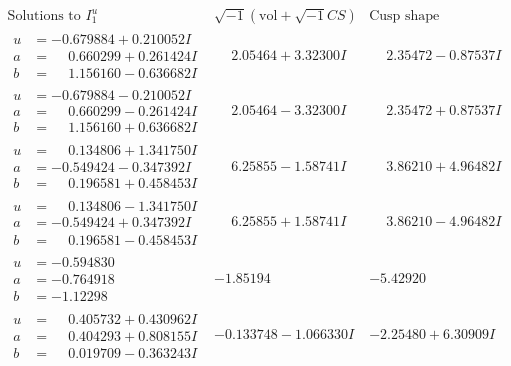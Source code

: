 \documentclass[1p]{elsarticle_modified}
\theoremstyle{definition}
\newcommand{\I}{\sqrt{-1}}
\begin{document}
$$\begin{array}{c|c|c}  
\text{Solutions to }I^u_{1}& \I (\text{vol} + \sqrt{-1}CS) & \text{Cusp shape}\\
 \hline 
\begin{aligned}
u &= -0.679884 + 0.210052 I \\
a &= \phantom{-}0.660299 + 0.261424 I \\
b &= \phantom{-}1.156160 - 0.636682 I\end{aligned}
 & \phantom{-}2.05464 + 3.32300 I & \phantom{-}2.35472 - 0.87537 I \\ \hline\begin{aligned}
u &= -0.679884 - 0.210052 I \\
a &= \phantom{-}0.660299 - 0.261424 I \\
b &= \phantom{-}1.156160 + 0.636682 I\end{aligned}
 & \phantom{-}2.05464 - 3.32300 I & \phantom{-}2.35472 + 0.87537 I \\ \hline\begin{aligned}
u &= \phantom{-}0.134806 + 1.341750 I \\
a &= -0.549424 - 0.347392 I \\
b &= \phantom{-}0.196581 + 0.458453 I\end{aligned}
 & \phantom{-}6.25855 - 1.58741 I & \phantom{-}3.86210 + 4.96482 I \\ \hline\begin{aligned}
u &= \phantom{-}0.134806 - 1.341750 I \\
a &= -0.549424 + 0.347392 I \\
b &= \phantom{-}0.196581 - 0.458453 I\end{aligned}
 & \phantom{-}6.25855 + 1.58741 I & \phantom{-}3.86210 - 4.96482 I \\ \hline\begin{aligned}
u &= -0.594830\phantom{ +0.000000I} \\
a &= -0.764918\phantom{ +0.000000I} \\
b &= -1.12298\phantom{ +0.000000I}\end{aligned}
 & -1.85194\phantom{ +0.000000I} & -5.42920\phantom{ +0.000000I} \\ \hline\begin{aligned}
u &= \phantom{-}0.405732 + 0.430962 I \\
a &= \phantom{-}0.404293 + 0.808155 I \\
b &= \phantom{-}0.019709 - 0.363243 I\end{aligned}
 & -0.133748 - 1.066330 I & -2.25480 + 6.30909 I \\ \hline\begin{aligned}

\end{aligned}
\end{array}$$
\end{document}
